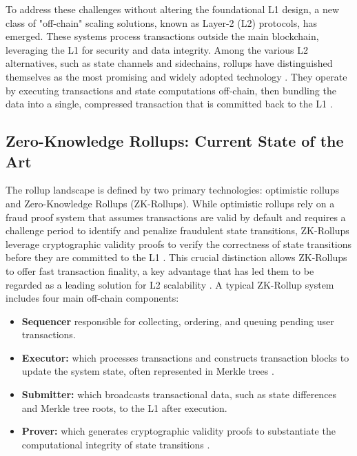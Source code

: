 To address these challenges without altering the foundational L1 design, a new class of "off-chain" scaling solutions, known as Layer-2 (L2) protocols, has emerged. These systems process transactions outside the main blockchain, leveraging the L1 for security and data integrity. Among the various L2 alternatives, such as state channels and sidechains, rollups have distinguished themselves as the most promising and widely adopted technology \cite{saif2024survey, habib2025analyzing, ethScalingDocs}. They operate by executing transactions and state computations off-chain, then bundling the data into a single, compressed transaction that is committed back to the L1 \cite{silva2025public}.

\vspace{12pt}
\subsection{Zero-Knowledge Rollups: Current State of the Art}
\vspace{12pt}

The rollup landscape is defined by two primary technologies: optimistic rollups and Zero-Knowledge Rollups (ZK-Rollups). While optimistic rollups rely on a fraud proof system that assumes transactions are valid by default and requires a challenge period to identify and penalize fraudulent state transitions, ZK-Rollups leverage cryptographic validity proofs to verify the correctness of state transitions before they are committed to the L1 \cite{motepalli2023sok}. This crucial distinction allows ZK-Rollups to offer fast transaction finality, a key advantage that has led them to be regarded as a leading solution for L2 scalability \cite{chaliasos2024pricing}.
A typical ZK-Rollup system includes four main off-chain components:
\vspace{12pt}
\begin{itemize}
    \item \textbf{Sequencer} responsible for collecting, ordering, and queuing pending user transactions.
    \item \textbf{Executor:} which processes transactions and constructs transaction blocks to update the system state, often represented in Merkle trees \cite{saez2022overview}.
    \item \textbf{Submitter:} which broadcasts transactional data, such as state differences and Merkle tree roots, to the L1 after execution.
    \item \textbf{Prover:} which generates cryptographic validity proofs to substantiate the computational integrity of state transitions \cite{motepalli2023sok}.
\end{itemize}

